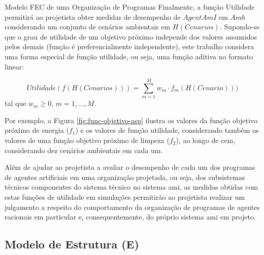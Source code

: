 \begin{section}{Modelo FEC de uma Organização de Programas}
    Finalmente, a função Utilidade permitirá ao projetista obter medidas de desempenho de $AgentAmI$ em $Amb$ considerando um conjunto de cenários ambientais em $H(Cenarios)$. Supondo-se que o grau de utilidade de um objetivo próximo independe dos valores assumidos pelos demais (função é preferencialmente independente), este trabalho considera uma forma especial de função utilidade, ou seja, uma função aditiva no formato linear:
    
    \begin{equation}\label{eq:func-util}
        Utilidade(f(H(Cenarios))) = \sum_{m=1}^M w_m \cdot f_m(H(Cenario)))
    \end{equation}
    tal que $w_m \geq 0$, $m =1, \ldots, M$.
    
    Por exemplo, a Figura \ref{fig:func-objetivo-asp} ilustra os valores da função objetivo próximo de energia ($f_1$) e os valores de função utilidade, considerando também os valores de uma função objetivo próximo de limpeza ($f_2$), ao longo de cem, considerando dez cenários ambientais em cada um. 
    
    \begin{figure}[h!]
        \centering
    \end{figure}

    Além de ajudar ao projetista a avaliar o desempenho de cada um dos programas de agentes artificiais em uma organização projetada, ou seja, dos subsistemas técnicos componentes do sistema técnico no sistema \acrshort{ami}, as medidas obtidas com estas funções de utilidade em simulações permitirão ao projetista realizar um julgamento a respeito do comportamento da organização de programas de agentes racionais em particular e, consequentemente, do próprio sistema \acrshort{ami} em projeto.
    
    \subsection{Modelo de Estrutura (E)}
    

\end{section}
